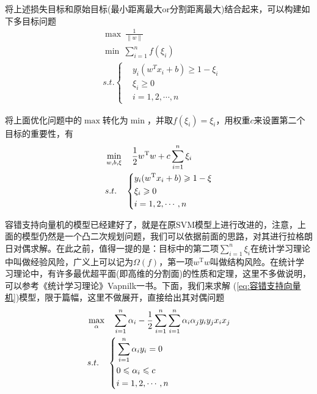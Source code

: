 	\par
	将上述损失目标和原始目标(最小距离最大or分割距离最大)结合起来，可以构建如下多目标问题
	\begin{align*}
	& \max\ {\frac{1}{\left\| w \right\|}} \\
	& \min\ {\sum_{i=1}^{n}f(\xi_i)} \\
	& s.t. \left\{
	\begin{aligned}
	& y_i(w^T x_i + b) \geqslant 1 - \xi_i \\
	& \xi_i \geqslant 0 \\
	& i = 1, 2, \cdots, n
	\end{aligned}
	\right.
	\end{align*}
	\par
	将上面优化问题中的$\max$转化为$\min$，并取$f(\xi_i)=\xi_i$，用权重$c$来设置第二个目标的重要性，有
	\begin{align}
	\label{eq:容错支持向量机}
	& \min_{w,b,\xi} \quad \frac{1}{2} w^\mathrm{T} w + c \sum_{i=1}^{n} \xi_i \\
	& s.t. \quad \left\{
		\begin{aligned}
		& y_i(w^\mathrm{T} x_i + b) \geqslant 1 - \xi \notag\\
		& \xi_i \geqslant 0 \notag\\
		& i = 1,2,\cdots,n \notag\\
		\end{aligned}
	\right.
	\end{align}
	\par
	容错支持向量机的模型已经建好了，就是在原SVM模型上进行改进的，注意，上面的模型仍然是一个凸二次规划问题，我们可以依据前面的思路，对其进行拉格朗日对偶求解。在此之前，值得一提的是：目标中的第二项$\sum_{i=1}^n\xi_i$在统计学习理论中叫做经验风险，广义上可以记为$\Omega (f)$，第一项$w^\mathrm{T}w$叫做结构风险。在统计学习理论中，有许多最优超平面(即高维的分割面)的性质和定理，这里不多做说明，可以参考《统计学习理论》Vapnilk一书。下面，我们来求解
	(\ref{eq:容错支持向量机})模型，限于篇幅，这里不做展开，直接给出其对偶问题
	\begin{align}
	\label{eq:容错支持向量机对偶模型}
	& \max_{\alpha} \quad \sum_{i=1}^{n} \alpha_i - \frac{1}{2}\sum_{i=1}^{n}\sum_{i=1}^{n}\alpha_i \alpha_j y_i y_j x_i x_j \\
	& s.t. \quad \left\{
		\begin{aligned}
		& \sum_{i=1}^{n} \alpha_i y_i = 0 \notag\\
		& 0 \leqslant \alpha_i \leqslant c \notag\\
		& i = 1,2,\cdots,n \notag\\
		\end{aligned}
	\right.
	\end{align}
